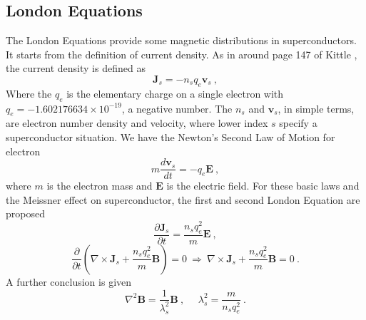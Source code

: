 \subsection{London Equations}
The London Equations provide some magnetic distributions in superconductors. It starts from the definition of current density. As in around page 147 of Kittle \cite{kittel2018introduction}, the current density is defined as  
$$
\mathbf{J}_s=-n_s q_e \mathbf{v}_s\ ,
$$
Where the $q_e$ is the elementary charge on a single electron with  $q_e=-1.602176634\times10^{-19}$, a negative number. The $n_s$ and $\mathbf{v}_s$, in simple terms, are electron number density and velocity, where lower index $s$ specify a superconductor situation. We have the Newton's Second Law of Motion for electron \cite{kittel2018introduction} 
\begin{equation}
m\frac{d\mathbf{v}_s}{dt}=-q_e\mathbf{E}\ ,
\label{equ:motion_perfectConducting}
\end{equation}
where $m$ is the electron mass and $\mathbf{E}$ is the electric field. For these basic laws and the Meissner effect on superconductor, the first and second London Equation are proposed
$$
\frac{\partial \mathbf{J}_s}{\partial t}=\frac{n_s q_e^2}{m}\mathbf{E}\ ,
$$
$$
\frac{\partial }{\partial t}\left(\nabla\times\mathbf{J}_s+\frac{n_s q_e^2}{m}\mathbf{B}\right)=0\ \Rightarrow\ 
\nabla\times\mathbf{J}_s+\frac{n_s q_e^2}{m}\mathbf{B}=0\ .
$$
A further conclusion is given  
\begin{equation}
	\nabla^2\mathbf{B}=\frac{1}{\lambda_s^2}\mathbf{B}\ ,\ \ \ \ \ \  \lambda_s^2=\frac{m}{n_s q_e^2}\ .
	\label{equ:B_superconducting}
\end{equation}


